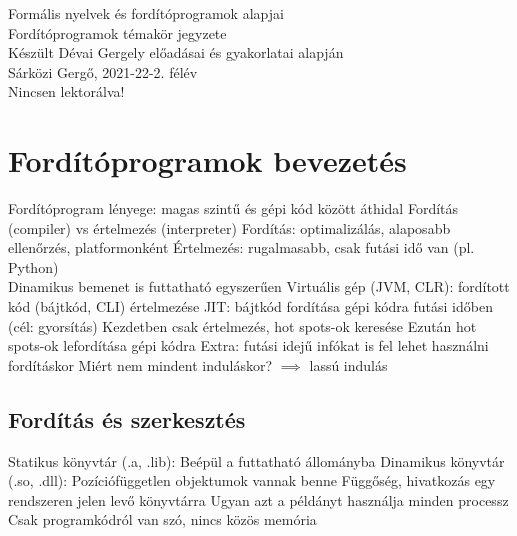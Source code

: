 \documentclass[12pt,a4paper]{article}
\begin{document}
\begin{center}
	\huge
	Formális nyelvek és fordítóprogramok alapjai\\
	\vspace{1mm}
	\LARGE
	Fordítóprogramok témakör jegyzete\\
	\vspace{5mm}
	\large
	Készült Dévai Gergely előadásai és gyakorlatai alapján\\
	\vspace{5mm}
	Sárközi Gergő, 2021-22-2. félév\\
	Nincsen lektorálva!
\end{center}

\tableofcontents

\pagebreak

\section{Fordítóprogramok bevezetés}

\begin{outline}
	\1 Fordítóprogram lényege: magas szintű és gépi kód között áthidal
	\1 Fordítás (compiler) vs értelmezés (interpreter)
		\2 Fordítás: optimalizálás, alaposabb ellenőrzés, platformonként
		\2 Értelmezés: rugalmasabb, csak futási idő van (pl. Python)\\
		Dinamikus bemenet is futtatható egyszerűen
	\1 Virtuális gép (JVM, CLR): fordított kód (bájtkód, CLI) értelmezése
	\1 JIT: bájtkód fordítása gépi kódra futási időben (cél: gyorsítás)
		\2 Kezdetben csak értelmezés, hot spots-ok keresése
		\2 Ezután hot spots-ok lefordítása gépi kódra
			\3 Extra: futási idejű infókat is fel lehet használni fordításkor
		\2 Miért nem mindent induláskor? $\implies$ lassú indulás
\end{outline}

\subsection{Fordítás és szerkesztés}

\begin{outline}
	\1 Statikus könyvtár (.a, .lib):
		\2 Beépül a futtatható állományba
	\1 Dinamikus könyvtár (.so, .dll):
		\2 Pozíciófüggetlen objektumok vannak benne
		\2 Függőség, hivatkozás egy rendszeren jelen levő könyvtárra
		\2 Ugyan azt a példányt használja minden processz
		\2 Csak programkódról van szó, nincs közös memória
\end{outline}
\end{document}
